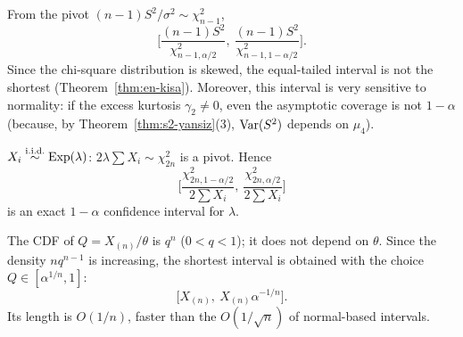 \documentclass[main.tex]{subfiles}
\begin{document}
\begin{example}
From the pivot $(n-1)S^2/\sigma^2\sim\chi^2_{n-1}$,
\[
\Big[\frac{(n-1)S^2}{\chi^2_{n-1,\alpha/2}},\ \frac{(n-1)S^2}{\chi^2_{n-1,1-\alpha/2}}\Big].
\]
Since the chi-square distribution is skewed, the equal-tailed interval is not the shortest (Theorem~\ref{thm:en-kisa}). Moreover, this interval is very sensitive to normality: if the excess kurtosis $\gamma_2\ne0$, even the asymptotic coverage is not $1-\alpha$ (because, by Theorem~\ref{thm:s2-yansiz}(3), $\operatorname{Var}(S^2)$ depends on $\mu_4$).
\end{example}

\begin{example}
$X_i\overset{\text{i.i.d.}}{\sim}\text{Exp}(\lambda)$: $2\lambda\sum X_i\sim\chi^2_{2n}$ is a pivot. Hence
\[
\Big[\frac{\chi^2_{2n,1-\alpha/2}}{2\sum X_i},\ \frac{\chi^2_{2n,\alpha/2}}{2\sum X_i}\Big]
\]
is an exact $1-\alpha$ confidence interval for $\lambda$.
\end{example}

\begin{example}
The CDF of $Q=X_{(n)}/\theta$ is $q^n$ ($0<q<1$); it does not depend on $\theta$. Since the density $nq^{n-1}$ is increasing, the shortest interval is obtained with the choice $Q\in[\alpha^{1/n},1]$:
\[
\big[X_{(n)},\ X_{(n)}\alpha^{-1/n}\big].
\]
Its length is $O(1/n)$, faster than the $O(1/\sqrt n)$ of normal-based intervals.
\end{example}
\end{document}
